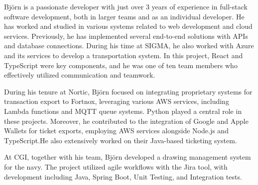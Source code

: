 Björn is a passionate developer with just over 3 years of experience in full-stack software development, both in larger teams and as an individual developer. He has worked and studied in various systems related to web development and cloud services. Previously, he has implemented several end-to-end solutions with APIs and database connections. During his time at SIGMA, he also worked with Azure and its services to develop a transportation system. In this project, React and TypeScript were key components, and he was one of ten team members who effectively utilized communication and teamwork.

\vspace{6pt}
During his tenure at Nortic, Björn focused on integrating proprietary systems for transaction export to Fortnox, leveraging various AWS services, including Lambda functions and MQTT queue systems. Python played a central role in these projects.
Moreover, he contributed to the integration of Google and Apple Wallets for ticket exports, employing AWS services alongside Node.js and TypeScript.He also extensively worked on their Java-based ticketing system.

\vspace{6pt}
At CGI, together with his team, Björn developed a drawing management system for the navy. The project utilized agile workflows with the Jira tool, with development including Java, Spring Boot, Unit Testing, and Integration tests.